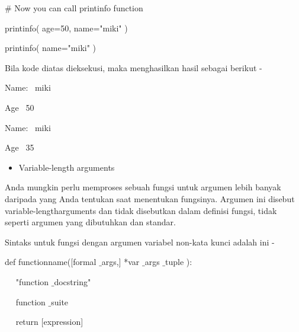 \vspace{12pt}
\noindent 
 \hspace*{0.5in}  $  \#  $ Now you can call printinfo function \par
\noindent 
 \hspace*{0.5in} printinfo( age=50, name="miki" ) \par
\noindent 
 \hspace*{0.5in} printinfo( name="miki" ) \par
 \vspace{\baselineskip}
\noindent 
Bila kode diatas dieksekusi, maka menghasilkan hasil sebagai berikut - \par
\noindent 
 \hspace*{0.5in} Name:~ miki \par
\noindent 
 \hspace*{0.5in} Age~ 50 \par
\noindent 
 \hspace*{0.5in} Name:~ miki \par
\noindent 
 \hspace*{0.5in} Age~ 35 \par
\vspace{12pt}
\noindent 
\begin{itemize}
	\item Variable-length arguments 
\end{itemize}
\noindent 
Anda mungkin perlu memproses sebuah fungsi untuk argumen lebih banyak daripada yang Anda tentukan saat menentukan fungsinya. Argumen ini disebut variable-lengtharguments dan tidak disebutkan dalam definisi fungsi, tidak seperti argumen yang dibutuhkan dan standar. \par
\vspace{\baselineskip}
\noindent 
Sintaks untuk fungsi dengan argumen variabel non-kata kunci adalah ini - \par
\vspace{\baselineskip}
\noindent 
 \hspace*{0.5in} def functionname([formal $  \_  $args,] *var $  \_  $args $  \_  $tuple ): \par
\noindent 
 \hspace*{0.5in} ~~ "function $  \_  $docstring" \par
\noindent 
 \hspace*{0.5in} ~~ function $  \_  $suite \par
\noindent 
 \hspace*{0.5in} ~~ return [expression] \par
